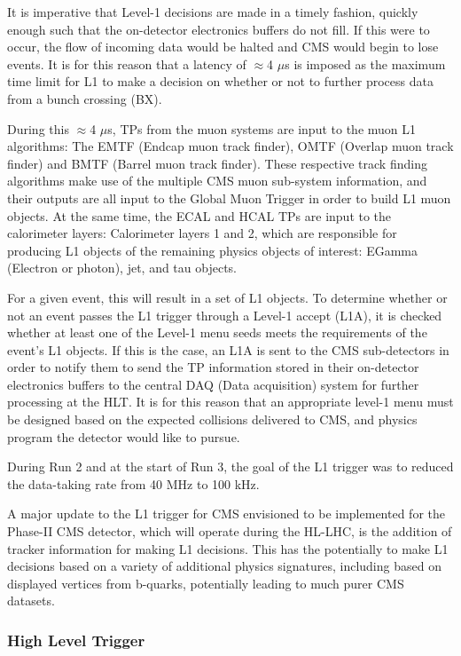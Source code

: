 It is imperative that Level-1 decisions are made in a timely fashion, quickly enough such that the on-detector electronics buffers do not fill. If this were to occur, the flow of incoming data would be halted and CMS would begin to lose events. It is for this reason that a latency of $\approx$4 $\mu$s is imposed as the maximum time limit for L1 to make a decision on whether or not to further process data from a bunch crossing (BX). 

During this $\approx$4 $\mu$s, TPs from the muon systems are input to the muon L1 algorithms: The EMTF (Endcap muon track finder), OMTF (Overlap muon track finder) and BMTF (Barrel muon track finder). These respective track finding algorithms make use of the multiple CMS muon sub-system information, and their outputs are all input to the Global Muon Trigger in order to build L1 muon objects. At the same time, the ECAL and HCAL TPs are input to the calorimeter layers: Calorimeter layers 1 and 2, which are responsible for producing L1 objects of the remaining physics objects of interest: EGamma (Electron or photon), jet, and tau objects. 

For a given event, this will result in a set of L1 objects. To determine whether or not an event passes the L1 trigger through a Level-1 accept (L1A), it is checked whether at least one of the Level-1 menu seeds meets the requirements of the event's L1 objects. If this is the case, an L1A is sent to the CMS sub-detectors in order to notify them to send the TP information stored in their on-detector electronics buffers to the central DAQ (Data acquisition) system for further processing at the HLT. It is for this reason that an appropriate level-1 menu must be designed based on the expected collisions delivered to CMS, and physics program the detector would like to pursue. 

During Run 2 and at the start of Run 3, the goal of the L1 trigger was to reduced the data-taking rate from 40 MHz to 100 kHz. 

A major update to the L1 trigger for CMS envisioned to be implemented for the Phase-II CMS detector, which will operate during the HL-LHC, is the addition of tracker information for making L1 decisions. This has the potentially to make L1 decisions based on a variety of additional physics signatures, including based on displayed vertices from b-quarks, potentially leading to much purer CMS datasets. 

\subsubsection{High Level Trigger}

